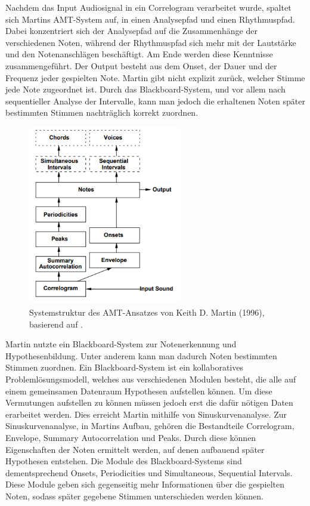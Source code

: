 Nachdem das Input Audiosignal in ein Correlogram verarbeitet wurde,
spaltet sich Martins AMT-System auf, in einen Analysepfad und einen Rhythmuspfad.
Dabei konzentriert sich der Analysepfad auf die Zusammenhänge der verschiedenen Noten,
während der Rhythmuspfad sich mehr mit der Lautstärke und den Notenanschlägen beschäftigt.
Am Ende werden diese Kenntnisse zusammengeführt.
Der Output besteht aus dem Onset, der Dauer und der Frequenz jeder gespielten Note.
Martin gibt nicht explizit zurück, welcher Stimme jede Note zugeordnet ist.
Durch das Blackboard-System, und vor allem nach sequentieller Analyse der Intervalle, kann man
jedoch die erhaltenen Noten später bestimmten Stimmen nachträglich korrekt zuordnen.

\begin{figure}[H]
    \centering
    \includegraphics[width=0.6\textwidth]{Graphics/Martin1996Structure}
    \caption[Systemstruktur nach Martin]{Systemstruktur des AMT-Ansatzes von Keith D. Martin (1996), basierend auf \cite{Martin1996}.}
    \label{fig:martin-structure}
\end{figure}

Martin nutzte ein Blackboard-System zur Notenerkennung und Hypothesenbildung.
Unter anderem kann man dadurch Noten bestimmten Stimmen zuordnen.
Ein Blackboard-System ist ein kollaboratives Problemlösungsmodell, welches aus verschiedenen Modulen besteht,
die alle auf einem gemeinsamen Datenraum Hypothesen aufstellen können.
Um diese Vermutungen aufstellen zu können müssen jedoch erst die dafür nötigen Daten erarbeitet werden.
Dies erreicht Martin mithilfe von Sinuskurvenanalyse.
Zur Sinuskurvenanalyse, in Martins Aufbau, gehören die Bestandteile
Correlogram, Envelope, Summary Autocorrelation und Peaks.
Durch diese können Eigenschaften der Noten ermittelt werden, auf denen aufbauend später Hypothesen entstehen.
Die Module des Blackboard-Systems sind dementsprechend
Onsets, Periodicities und Simultaneous, Sequential Intervals.
Diese Module geben sich gegenseitig mehr Informationen über die gespielten Noten,
sodass später gegebene Stimmen unterschieden werden können.

